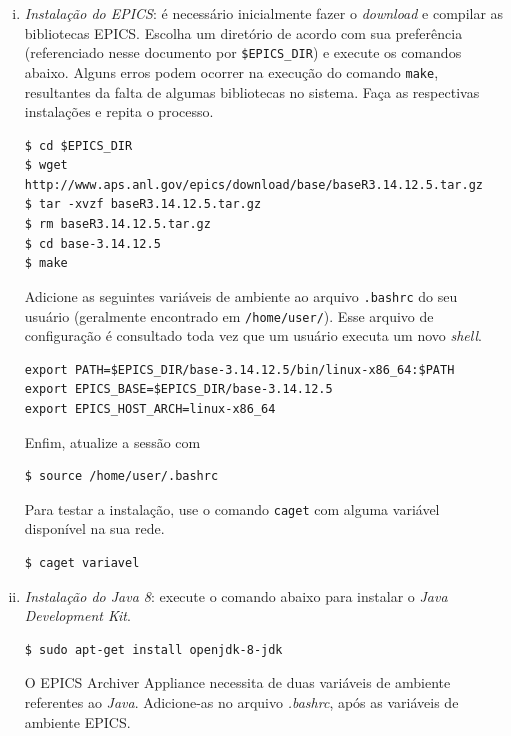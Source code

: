 \begin {enumerate}[i.] 
  \item \textit{Instalação do EPICS}: é necessário inicialmente fazer o
  \textit{download} e compilar as bibliotecas EPICS. Escolha um diretório de
  acordo com sua preferência (referenciado nesse documento por
  \texttt{\$EPICS\_DIR}) e execute os comandos abaixo. Alguns erros podem
  ocorrer na execução do comando \texttt{make}, resultantes da falta de algumas
  bibliotecas no sistema. Faça as respectivas instalações e repita o processo.
\begin{lstlisting}[keywordstyle=\ttfamily, style=nonumbers]
$ cd $EPICS_DIR
$ wget http://www.aps.anl.gov/epics/download/base/baseR3.14.12.5.tar.gz
$ tar -xvzf baseR3.14.12.5.tar.gz
$ rm baseR3.14.12.5.tar.gz
$ cd base-3.14.12.5
$ make
\end{lstlisting}

Adicione as seguintes variáveis de ambiente ao arquivo \texttt{.bashrc} do seu
usuário (geralmente encontrado em \texttt{/home/user/}). Esse arquivo de
configuração é consultado toda vez que um usuário executa um novo
\textit{shell}.
\begin{lstlisting}[keywordstyle=\ttfamily, style=nonumbers]
export PATH=$EPICS_DIR/base-3.14.12.5/bin/linux-x86_64:$PATH
export EPICS_BASE=$EPICS_DIR/base-3.14.12.5
export EPICS_HOST_ARCH=linux-x86_64
\end{lstlisting}	

Enfim, atualize a sessão com

\begin{lstlisting}[keywordstyle=\ttfamily, style=nonumbers]
$ source /home/user/.bashrc
\end{lstlisting}	

Para testar a instalação, use o comando \texttt{caget} com
alguma variável disponível na sua rede.

\begin{lstlisting}[keywordstyle=\ttfamily, style=nonumbers]
$ caget variavel
\end{lstlisting}

\item \textit{Instalação do Java 8}: execute o comando abaixo para instalar o
\textit{Java Development Kit}.
\begin{lstlisting}[keywordstyle=\ttfamily, style=nonumbers]
$ sudo apt-get install openjdk-8-jdk
\end{lstlisting}

O EPICS Archiver Appliance necessita de duas variáveis de ambiente referentes ao
\textit{Java}. Adicione-as no arquivo \textit{.bashrc}, após as variáveis de
ambiente EPICS.


\end{enumerate}
